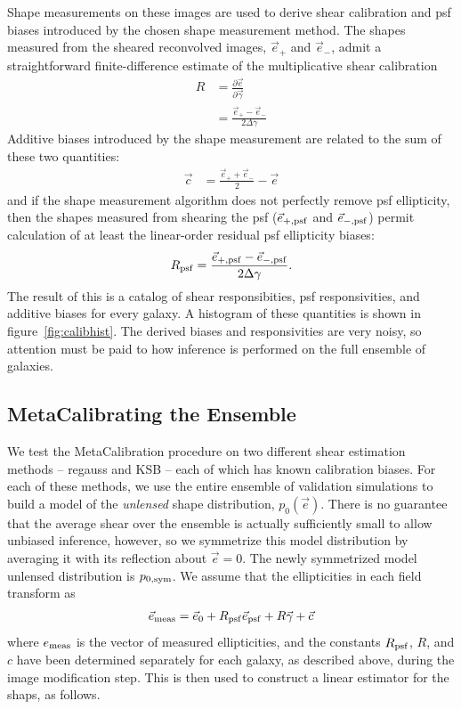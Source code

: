 \documentclass[iop]{emulateapj}
\begin{document}
Shape measurements on these images are used to derive shear
calibration and psf biases {introduced by the chosen shape measurement
  method}. The shapes measured from the sheared reconvolved images,
$\vec{e}_{+}$ and $\vec{e}_{-}$, admit a straightforward
finite-difference estimate of the multiplicative shear calibration
\begin{align}
R &= \frac{\partial \vec{e}}{\partial \vec{\gamma}}  \\
 &=\frac{\vec{e}_{+} - \vec{e}_{-}}{2\Delta\gamma}
\end{align}
Additive biases introduced by the shape measurement are related to the sum of these two quantities:
\begin{align}
\vec{c} &= \frac{\vec{e}_{+} + \vec{e}_{-}}{2} - \vec{e}
\end{align}
and if the shape measurement algorithm does not perfectly remove psf
ellipticity, then the shapes measured from shearing the psf
($\vec{e}_{+,\rm psf}$ and $\vec{e}_{-,\rm psf}$) permit calculation
of at least the linear-order residual psf ellipticity biases:
\begin{align}
R_{\rm psf} = \frac{\vec{e}_{+,\rm psf} - \vec{e}_{-,\rm psf}}{2\Delta\gamma}.
\end{align}
The result of this is a catalog of shear responsibities, psf
responsivities, and additive biases for every galaxy. A histogram of
these quantities is shown in figure~\ref{fig:calibhist}. The derived
biases and responsivities are very noisy, so attention must be paid to
how inference is performed on the full ensemble of galaxies.




\subsection{MetaCalibrating the Ensemble}
We test the MetaCalibration procedure on two different shear
estimation methods -- {\sc regauss} and {\sc KSB} -- each of which has
known calibration biases. For each of these methods, we use the entire
ensemble of validation simulations to build a model of the {\it
  unlensed} shape distribution, $p_0(\vec{e})$. There is no guarantee
that the average shear over the ensemble is actually sufficiently
small to allow unbiased inference, however, so we symmetrize this
model distribution by averaging it with its reflection about
$\vec{e}=0$. The newly symmetrized model unlensed distribution is
$p_{0,\rm sym}$. We assume that the ellipticities in each field
transform as
\begin{align}
\vec{e}_{\rm meas} = \vec{e}_{0} + R_{\rm psf} \vec{e}_{\rm psf} + R\vec{\gamma} + \vec{c}
\label{eqn:edist_model}
\end{align}
where $e_{\rm meas}$ is the vector of measured ellipticities, and the
constants $R_{\rm psf}$, $R$, and $c$ have been determined separately
for each galaxy, as described above, during the image modification
step. This is then used to construct a linear estimator for the
shaps, as follows.
\end{document}
